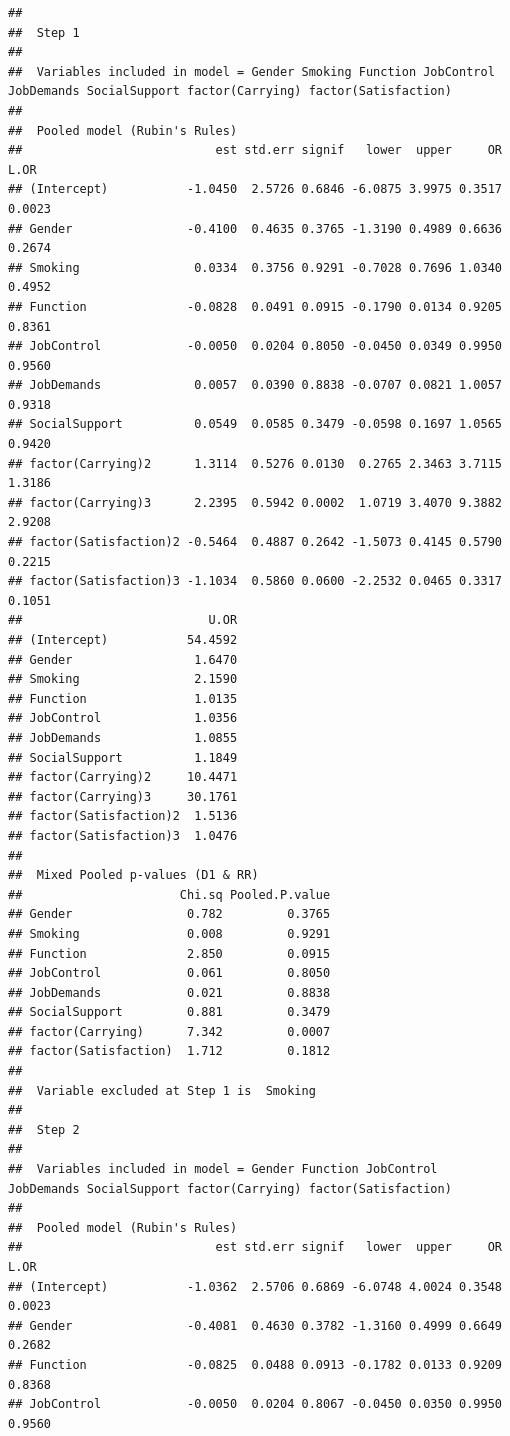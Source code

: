 \documentclass[]{book}
\begin{document}
\begin{verbatim}
## 
##  Step 1 
## 
##  Variables included in model = Gender Smoking Function JobControl JobDemands SocialSupport factor(Carrying) factor(Satisfaction) 
## 
##  Pooled model (Rubin's Rules) 
##                           est std.err signif   lower  upper     OR   L.OR
## (Intercept)           -1.0450  2.5726 0.6846 -6.0875 3.9975 0.3517 0.0023
## Gender                -0.4100  0.4635 0.3765 -1.3190 0.4989 0.6636 0.2674
## Smoking                0.0334  0.3756 0.9291 -0.7028 0.7696 1.0340 0.4952
## Function              -0.0828  0.0491 0.0915 -0.1790 0.0134 0.9205 0.8361
## JobControl            -0.0050  0.0204 0.8050 -0.0450 0.0349 0.9950 0.9560
## JobDemands             0.0057  0.0390 0.8838 -0.0707 0.0821 1.0057 0.9318
## SocialSupport          0.0549  0.0585 0.3479 -0.0598 0.1697 1.0565 0.9420
## factor(Carrying)2      1.3114  0.5276 0.0130  0.2765 2.3463 3.7115 1.3186
## factor(Carrying)3      2.2395  0.5942 0.0002  1.0719 3.4070 9.3882 2.9208
## factor(Satisfaction)2 -0.5464  0.4887 0.2642 -1.5073 0.4145 0.5790 0.2215
## factor(Satisfaction)3 -1.1034  0.5860 0.0600 -2.2532 0.0465 0.3317 0.1051
##                          U.OR
## (Intercept)           54.4592
## Gender                 1.6470
## Smoking                2.1590
## Function               1.0135
## JobControl             1.0356
## JobDemands             1.0855
## SocialSupport          1.1849
## factor(Carrying)2     10.4471
## factor(Carrying)3     30.1761
## factor(Satisfaction)2  1.5136
## factor(Satisfaction)3  1.0476
## 
##  Mixed Pooled p-values (D1 & RR) 
##                      Chi.sq Pooled.P.value
## Gender                0.782         0.3765
## Smoking               0.008         0.9291
## Function              2.850         0.0915
## JobControl            0.061         0.8050
## JobDemands            0.021         0.8838
## SocialSupport         0.881         0.3479
## factor(Carrying)      7.342         0.0007
## factor(Satisfaction)  1.712         0.1812
## 
##  Variable excluded at Step 1 is  Smoking 
## 
##  Step 2 
## 
##  Variables included in model = Gender Function JobControl JobDemands SocialSupport factor(Carrying) factor(Satisfaction) 
## 
##  Pooled model (Rubin's Rules) 
##                           est std.err signif   lower  upper     OR   L.OR
## (Intercept)           -1.0362  2.5706 0.6869 -6.0748 4.0024 0.3548 0.0023
## Gender                -0.4081  0.4630 0.3782 -1.3160 0.4999 0.6649 0.2682
## Function              -0.0825  0.0488 0.0913 -0.1782 0.0133 0.9209 0.8368
## JobControl            -0.0050  0.0204 0.8067 -0.0450 0.0350 0.9950 0.9560

\end{verbatim}
\end{document}
